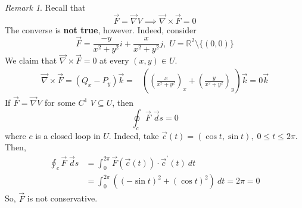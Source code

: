 \documentclass[12pt]{book}
\theoremstyle{definition}
\theoremstyle{remark}
\newtheorem*{remark}{Remark}
\begin{document}
  \begin{remark} 
    Recall that 
    $$\vec{{F}} = \vec \nabla V \implies \vec \nabla \times \vec F = 0 $$
    The converse is \textbf{not true}, however. Indeed, consider 
    $$\vec{{F}} = \frac{-y}{x^2 + y^2} i + \frac{x}{x^2 + y^2} j , \; U = \mathbb{R}^2 \setminus \{ (0,0) \}  $$
    We claim that $\vec \nabla \times \vec F = 0 $ at every $(x,y) \in U$. 
    \begin{equation*}
      \begin{split}
        \vec \nabla \times \vec F = (Q_x - P_y) \vec k =& \left( \left( \frac{x}{x^2 + y^2}  \right)_x + \left( \frac{y}{x^2 + y^2}  \right)_y \right) \vec k = 0 \vec k
      \end{split}
    \end{equation*}
    If $\vec F = \vec \nabla V$ for some $C^1$ $V \subseteq U$, then $$\oint_c \vec{{F}} \; \vec ds = 0$$
    where $c$ is a closed loop in $U$. Indeed, take $\vec{{c}} (t) = (\cos t , \sin t), \; 0 \leq t \leq 2\pi$. Then, 
    \begin{equation*}
      \begin{split}
        \oint_c \vec{{F}} \; \vec ds &= \int_{{0}}^{{2 \pi}} \vec{{F}} (\vec{{c}} (t))\cdot \vec{{c}}^ \prime (t) \: d{t} {} \\  
        & = \int_{{0}}^{{2 \pi}} ((- \sin t)^2 + ( \cos t )^2) \: d{t}  = 2 \pi = 0
      \end{split}
    \end{equation*}
    So, $\vec{{F}} $ is not conservative.  
      \end{remark}
\end{document}
